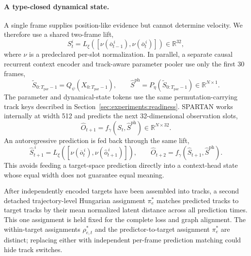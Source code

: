 \paragraph{A type-closed dynamical state.}
A single frame supplies position-like evidence but cannot determine velocity.  We therefore use a
shared two-frame lift,
\begin{equation}
    S_t^i=L_\xi\!\left([\nu(\overline o_{t-1}^{\,i}),
                         \nu(\overline o_t^{\,i})]\right)
       \in\mathbb{R}^{32},
    \label{eq:temporal-lift}
\end{equation}
where $\nu$ is a predeclared per-slot normalization.  In parallel, a separate causal recurrent
context encoder and track-aware parameter pooler use only the first 30 frames,
\begin{equation}
    \widetilde S_{0:T_{\mathrm{par}}-1}
       =Q_\psi(X_{0:T_{\mathrm{par}}-1}),
    \qquad
    \widehat S^{\mathrm{ph}}
       =P_\eta(\widetilde S_{0:T_{\mathrm{par}}-1})
       \in\mathbb{R}^{N\times1}.
    \label{eq:visual-parameter-context}
\end{equation}
The parameter and dynamical-state tokens use the same permutation-carrying track keys described
in Section~\ref{sec:experiments:readiness}.  SPARTAN works internally at width 512 and predicts
the next 32-dimensional observation slots,
\begin{equation}
    \widehat O_{t+1}=f_\gamma(S_t,\widehat S^{\mathrm{ph}})
       \in\mathbb{R}^{N\times32}.
    \label{eq:fully-visual-prediction}
\end{equation}
An autoregressive prediction is fed back through the same lift,
\begin{equation}
    \widehat S_{t+1}^{\,i}
       =L_\xi\!\left([\nu(\overline o_t^{\,i}),
                       \nu(\widehat o_{t+1}^{\,i})]\right),
    \qquad
    \widehat O_{t+2}=f_\gamma(\widehat S_{t+1},\widehat S^{\mathrm{ph}}).
    \label{eq:type-closed-rollout}
\end{equation}
This avoids feeding a target-space prediction directly into a context-head state whose equal
width does not guarantee equal meaning.

After independently encoded targets have been assembled into tracks, a second detached
trajectory-level Hungarian assignment $\pi_e^*$ matches predicted tracks to target tracks by
their mean normalized latent distance across all prediction times.  This one assignment is held
fixed for the complete loss and graph alignment.  The within-target assignments $\rho_{e,t}^*$
and the predictor-to-target assignment $\pi_e^*$ are distinct; replacing either with independent
per-frame prediction matching could hide track switches.

